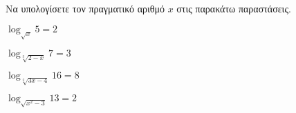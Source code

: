 Να υπολογίσετε τον πραγματικό αριθμό $ x $ στις παρακάτω παραστάσεις.
\begin{multicols}{2}
\begin{rlist}[leftmargin=4mm]
\item $ \log_{\sqrt{x}}{5}=2 $
\item $ \log_{\sqrt[3]{2-x}}{7}=3 $
\item $ \log_{\sqrt[4]{3x-4}}{16}=8 $
\item $ \log_{\sqrt{x^2-3}}{13}=2 $
\end{rlist}
\end{multicols}
